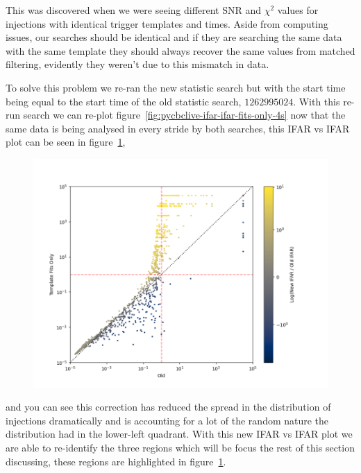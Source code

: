 This was discovered when we were seeing different SNR and $\chi^{2}$ values for injections with identical trigger templates and times. Aside from computing issues, our searches should be identical and if they are searching the same data with the same template they should always recover the same values from matched filtering, evidently they weren't due to this mismatch in data.

To solve this problem we re-ran the new statistic search but with the start time being equal to the start time of the old statistic search, $1262995024$. With this re-run search we can re-plot figure~\ref{fig:pycbclive-ifar-ifar-fits-only-4s} now that the same data is being analysed in every stride by both searches, this IFAR vs IFAR plot can be seen in figure~\ref{fig:pycbclive-ifar-ifar-fits-only-0s},
%
\begin{figure}
       \centering
    \includegraphics[width=1.2\textwidth]{images/5_pycbclive/fits_only_0s_ifar_vs_ifar_log_ifar_diff.png}
    \caption{}
    \label{fig:pycbclive-ifar-ifar-fits-only-0s}
\end{figure}
%
and you can see this correction has reduced the spread in the distribution of injections dramatically and is accounting for a lot of the random nature the distribution had in the lower-left quadrant. With this new IFAR vs IFAR plot we are able to re-identify the three regions which will be focus the rest of this section discussing, these regions are highlighted in figure~\ref{fig:pycbclive-ifar-ifar-fits-only-0s}.
%
